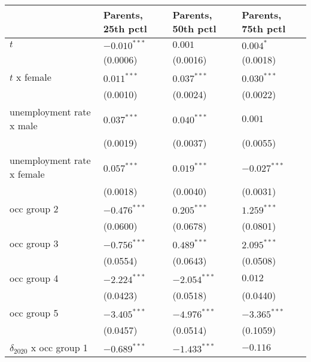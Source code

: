 \begin{tabular}{llll}
\toprule
{} & Parents, 25th pctl & Parents, 50th pctl & Parents, 75th pctl \\
\midrule
$t$                                    &     $-0.010^{***}$ &            $0.001$ &          $0.004^*$ \\
                                       &           (0.0006) &           (0.0016) &           (0.0018) \\
$t$ x female                           &      $0.011^{***}$ &      $0.037^{***}$ &      $0.030^{***}$ \\
                                       &           (0.0010) &           (0.0024) &           (0.0022) \\
unemployment rate x male               &      $0.037^{***}$ &      $0.040^{***}$ &            $0.001$ \\
                                       &           (0.0019) &           (0.0037) &           (0.0055) \\
unemployment rate x female             &      $0.057^{***}$ &      $0.019^{***}$ &     $-0.027^{***}$ \\
                                       &           (0.0018) &           (0.0040) &           (0.0031) \\
occ group 2                            &     $-0.476^{***}$ &      $0.205^{***}$ &      $1.259^{***}$ \\
                                       &           (0.0600) &           (0.0678) &           (0.0801) \\
occ group 3                            &     $-0.756^{***}$ &      $0.489^{***}$ &      $2.095^{***}$ \\
                                       &           (0.0554) &           (0.0643) &           (0.0508) \\
occ group 4                            &     $-2.224^{***}$ &     $-2.054^{***}$ &            $0.012$ \\
                                       &           (0.0423) &           (0.0518) &           (0.0440) \\
occ group 5                            &     $-3.405^{***}$ &     $-4.976^{***}$ &     $-3.365^{***}$ \\
                                       &           (0.0457) &           (0.0514) &           (0.1059) \\
$\delta_{2020}$ x occ group 1          &     $-0.689^{***}$ &     $-1.433^{***}$ &           $-0.116$ \\

\end{tabular}
